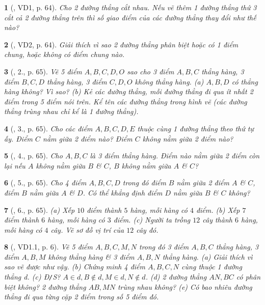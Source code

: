 \documentclass{article}
\newtheorem{baitoan}{}
\begin{document}
\begin{baitoan}[\cite{Binh_Toan_6_tap_2}, VD1, p. 64]
	Cho 2 đường thẳng cắt nhau. Nếu vẽ thêm 1 đường thẳng thứ 3 cắt cả 2 đường thẳng trên thì số giao điểm của các đường thẳng thay đổi như thế nào?
\end{baitoan}

\begin{baitoan}[\cite{Binh_Toan_6_tap_2}, VD2, p. 64]
	Giải thích vì sao 2 đường thẳng phân biệt hoặc có 1 điểm chung, hoặc không có điểm chung nào.
\end{baitoan}

\begin{baitoan}[\cite{Binh_Toan_6_tap_2}, 2., p. 65]
	Vẽ 5 điểm $A,B,C,D,O$ sao cho 3 điểm $A,B,C$ thẳng hàng, 3 điểm $B,C,D$ thẳng hàng, 3 điểm $C,D,O$ không thẳng hàng. (a) $A,B,D$ có thẳng hàng không? Vì sao? (b) Kẻ các đường thẳng, mỗi đường thẳng đi qua ít nhất 2 điểm trong 5 điểm nói trên. Kể tên các đường thẳng trong hình vẽ (các đường thẳng trùng nhau chỉ kể là 1 đường thẳng).
\end{baitoan}

\begin{baitoan}[\cite{Binh_Toan_6_tap_2}, 3., p. 65]
	Cho các điểm $A,B,C,D,E$ thuộc cùng 1 đường thẳng theo thứ tự ấy. Điểm $C$ nằm giữa 2 điểm nào? Điểm $C$ không nằm giữa 2 điểm nào?
\end{baitoan}

\begin{baitoan}[\cite{Binh_Toan_6_tap_2}, 4., p. 65]
	Cho $A,B,C$ là 3 điểm thẳng hàng. Điểm nào nằm giữa 2 điểm còn lại nếu $A$ không nằm giữa $B$ \& $C$, $B$ không nằm giữa $A$ \& $C$?
\end{baitoan}

\begin{baitoan}[\cite{Binh_Toan_6_tap_2}, 5., p. 65]
	Cho 4 điểm $A,B,C,D$ trong đó điểm $B$ nằm giữa 2 điểm $A$ \& $C$, điểm $B$ nằm giữa $A$ \& $D$. Có thể khẳng định điểm $D$ nằm giữa $B$ \& $C$ không?
\end{baitoan}

\begin{baitoan}[\cite{Binh_Toan_6_tap_2}, 6., p. 65]
	(a) Xếp $10$ điểm thành $5$ hàng, mỗi hàng có $4$ điểm. (b) Xếp $7$ điểm thành $6$ hàng, mỗi hàng có $3$ điểm. (c) Người ta trồng $12$ cây thành $6$ hàng, mỗi hàng có $4$ cây. Vẽ sơ đồ vị trí của $12$ cây đó.
\end{baitoan}

\begin{baitoan}[\cite{TLCT_THCS_Toan_6_hinh_hoc}, VD1.1, p. 6]
	Vẽ 5 điểm $A,B,C,M,N$ trong đó 3 điểm $A,B,C$ thẳng hàng, 3 điểm $A,B,M$ không thẳng hàng \& 3 điểm $A,B,N$ thẳng hàng. (a) Giải thích vì sao vẽ được như vậy. (b) Chứng minh 4 điểm $A,B,C,N$ cùng thuộc 1 đường thẳng d. (c) {\rm Đ{\tt/}S?} $A\in d,B\notin d,M\in d,N\notin d$. (d) 2 đường thẳng $AN,BC$ có phân biệt không? 2 đường thẳng $AB,MN$ trùng nhau không? (e) Có bao nhiêu đường thẳng đi qua từng cặp 2 điểm trong số 5 điểm đó.
\end{baitoan}
\end{document}
